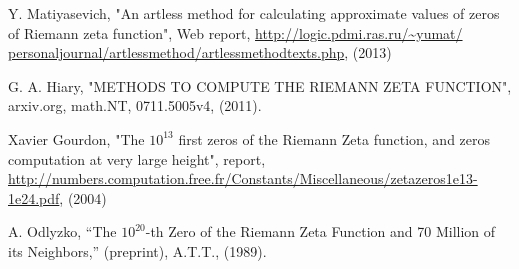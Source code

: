 \documentclass[twoside]{article}
\begin{document}
\begin{thebibliography}{10}
 Y. Matiyasevich, 
"An artless method for calculating approximate values of
zeros of Riemann zeta function",
Web report, \url{http://logic.pdmi.ras.ru/~yumat/
personaljournal/artlessmethod/artlessmethodtexts.php}, (2013)

 G. A. Hiary,
"METHODS TO COMPUTE THE RIEMANN ZETA
FUNCTION", arxiv.org, math.NT, 0711.5005v4, (2011).

 Xavier Gourdon,
"The $10^{13}$ first zeros of the Riemann Zeta function,
and zeros computation at very large height", report,
\url{http://numbers.computation.free.fr/Constants/Miscellaneous/zetazeros1e13-1e24.pdf}, (2004)

 A. Odlyzko, ``The $10^{20}$-th Zero of the Riemann Zeta
Function and 70 Million of its Neighbors,'' (preprint), A.T.T., (1989).

\end{thebibliography} 
\end{document}
